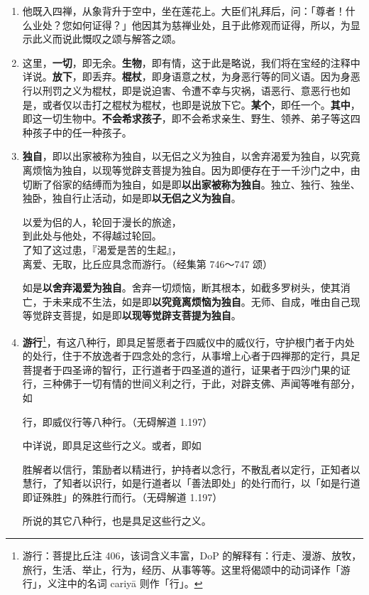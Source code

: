 \begin{enumerate}
\item 他既入四禅，从象背升于空中，坐在莲花上。大臣们礼拜后，问：「尊者！什么业处？您如何证得？」他因其为慈禅业处，且于此修观而证得，所以，为显示此义而说此慨叹之颂与解答之颂。
\item 这里，\textbf{一切}，即无余。\textbf{生物}，即有情，这于此是略说，我们将在宝经的注释中详说。\textbf{放下}，即丢弃。\textbf{棍杖}，即身语意之杖，为身恶行等的同义语。因为身恶行以刑罚之义为棍杖，即是说迫害、令遭不幸与灾祸，语恶行、意恶行也如是，或者仅以击打之棍杖为棍杖，也即是说放下它。\textbf{某个}，即任一个。\textbf{其中}，即这一切生物中。\textbf{不会希求孩子}，即不会希求亲生、野生、领养、弟子等这四种孩子中的任一种孩子。
\item \textbf{独自}，即以出家被称为独自，以无侣之义为独自，以舍弃渴爱为独自，以究竟离烦恼为独自，以现等觉辟支菩提为独自。因为即便存在于一千沙门之中，由切断了俗家的结缚而为独自，如是即\textbf{以出家被称为独自}。独立、独行、独坐、独卧，独自行止活动，如是即\textbf{以无侣之义为独自}。\begin{quoting}以爱为侣的人，轮回于漫长的旅途，\\到此处与他处，不得越过轮回。\\了知了这过患，『渴爱是苦的生起』，\\离爱、无取，比丘应具念而游行。（经集第 746～747 颂）\end{quoting}如是\textbf{以舍弃渴爱为独自}。舍弃一切烦恼，断其根本，如截多罗树头，使其消亡，于未来成不生法，如是即\textbf{以究竟离烦恼为独自}。无师、自成，唯由自己现等觉辟支菩提，如是即\textbf{以现等觉辟支菩提为独自}。
\item \textbf{游行}\footnote{游行：菩提比丘注 406，该词含义丰富，DoP 的解释有：行走、漫游、放牧，旅行，生活、举止，行为，经历、从事等等。这里将偈颂中的动词译作「游行」，义注中的名词 cariyā 则作「行」。}，有这八种行，即具足誓愿者于四威仪中的威仪行，守护根门者于内处的处行，住于不放逸者于四念处的念行，从事增上心者于四禅那的定行，具足菩提者于四圣谛的智行，正行道者于四圣道的道行，证果者于四沙门果的证行，三种佛于一切有情的世间义利之行，于此，对辟支佛、声闻等唯有部分，如\begin{quoting}行，即威仪行等八种行。（无碍解道 1.197）\end{quoting}中详说，即具足这些行之义。或者，即如\begin{quoting}胜解者以信行，策励者以精进行，护持者以念行，不散乱者以定行，正知者以慧行，了知者以识行，如是行道者以「善法即处」的处行而行，以「如是行道即证殊胜」的殊胜行而行。（无碍解道 1.197）\end{quoting}所说的其它八种行，也是具足这些行之义。

\end{enumerate}
